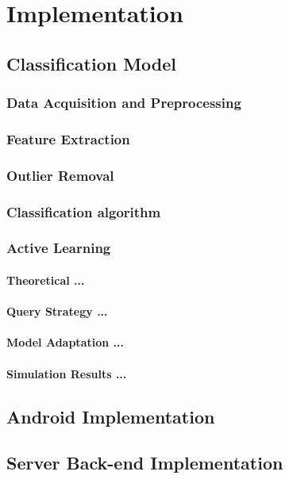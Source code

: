 \chapter{Implementation}\label{cha3}

\section{Classification Model}

\subsection{Data Acquisition and Preprocessing}

\subsection{Feature Extraction}

\subsection{Outlier Removal}

\subsection{Classification algorithm}

\subsection{Active Learning}

\subsubsection{Theoretical ...}

\subsubsection{Query Strategy ...}

\subsubsection{Model Adaptation ...}

\subsubsection{Simulation Results ...}


\section{Android Implementation}

\section{Server Back-end Implementation}

